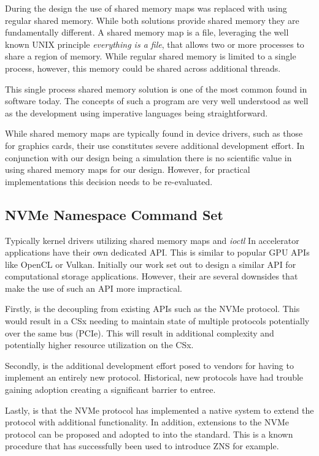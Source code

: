 During the design the use of shared memory maps was replaced with using regular
shared memory. While both solutions provide shared memory they are fundamentally
different. A shared memory map is a file, leveraging the well known UNIX
principle \textit{everything is a file}, that allows two or more processes to
share a region of memory. While regular shared memory is limited to a single
process, however, this memory could be shared across additional threads.

This single process shared memory solution is one of the most common found in
software today. The concepts of such a program are very well understood as
well as the development using imperative languages being straightforward.

While shared memory maps are typically found in device drivers, such as those
for graphics cards, their use constitutes severe additional development effort.
In conjunction with our design being a simulation there is no scientific value
in using shared memory maps for our design. However, for practical
implementations this decision needs to be re-evaluated.

\subsection{NVMe Namespace Command Set}

Typically kernel drivers utilizing shared memory maps and \textit{ioctl} In
accelerator applications have their own dedicated API. This is similar to
popular GPU APIs like OpenCL or Vulkan. Initially our work set out to design
a similar API for computational storage applications. However, their are several
downsides that make the use of such an API more impractical.

Firstly, is the decoupling from existing APIs such as the NVMe protocol. This
would result in a CSx needing to maintain state of multiple protocols
potentially over the same bus (PCIe). This will result in additional complexity
and potentially higher resource utilization on the CSx.

Secondly, is the additional development effort posed to vendors for having to
implement an entirely new protocol. Historical, new protocols have had trouble
gaining adoption creating a significant barrier to entree.

Lastly, is that the NVMe protocol has implemented a native system to extend the
protocol with additional functionality. In addition, extensions to the NVMe
protocol can be proposed and adopted to into the standard. This is a known
procedure that has successfully been used to introduce ZNS \cite{nvme-zns} for
example.

